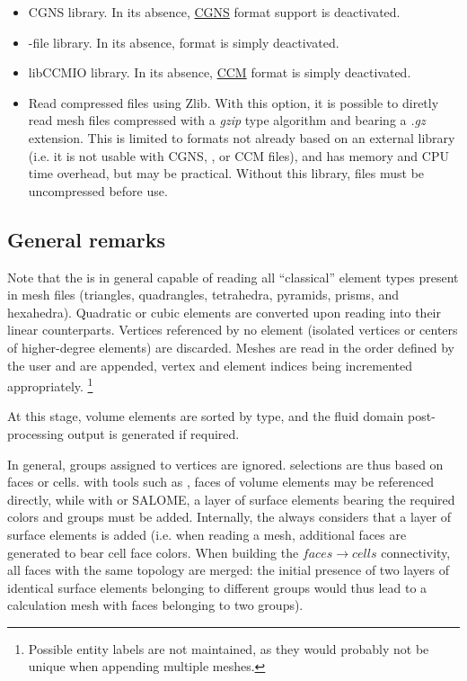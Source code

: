 {{{\begin{itemize}

\item CGNS library. In its absence, \hyperref[fmtdesc:cgns]{CGNS}
      format support is deactivated.

\item \med-file library. In its absence, \hyperref[fmtdesc:med]{\med}
      format is simply deactivated.

\item libCCMIO library. In its absence, \hyperref[fmtdesc:ccm]{CCM}
      format is simply deactivated.

\item Read compressed files using Zlib. With this option, it is
      possible to diretly read mesh files compressed with a
      \emph{gzip} type algorithm and bearing a \emph{.gz} extension.
      This is limited to formats not already based on an external
      library (i.e. it is not usable with CGNS, \med, or CCM files),
      and has memory and CPU time overhead, but may be practical.
      Without this library, files must be uncompressed before use.

\end{itemize}

\subsection{General remarks}

Note that the \pcs is in general capable of reading all ``classical''
element types present in mesh files (triangles, quadrangles, tetrahedra,
pyramids, prisms, and hexahedra).
Quadratic or cubic elements are converted upon reading into their
linear counterparts. Vertices referenced by no element (isolated vertices
or centers of higher-degree elements) are discarded. Meshes are read
in the order defined by the user and are appended, vertex and element
indices being incremented appropriately.
\footnote{Possible entity labels are not maintained, as they would
probably not be unique when appending multiple meshes.}

At this stage, volume elements are sorted by type, and the fluid domain
post-processing output is generated if required.

In general, groups assigned to vertices are ignored.
selections are thus based on faces or cells. with tools such
as \simail, faces of volume elements may be referenced directly, while
with \ideas or SALOME, a layer of surface elements bearing the required
colors and groups must be added. Internally, the \pcs always considers
that a layer of surface elements is added (i.e. when reading a \simail
mesh, additional faces are generated to bear cell face colors.
When building the $faces \rightarrow cells$ connectivity, all faces with the
same topology are merged: the initial presence of two layers of identical
surface elements belonging to different groups would thus lead to
a calculation mesh with faces belonging to two groups).

}}}
